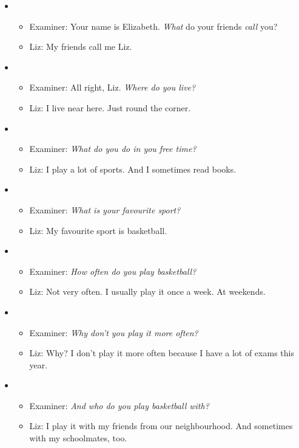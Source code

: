 \begin{itemize}

\item
\begin{itemize}
\item Examiner: Your name is Elizabeth. \textit{What} do your friends \textit{call} you?
\item Liz: My friends call me Liz.
\end{itemize}

\item
\begin{itemize}
\item Examiner: All right, Liz. \textit{Where do you live?}
\item Liz: I live near here. Just round the corner.
\end{itemize}

\item
\begin{itemize}
\item Examiner: \textit{What do you do in you free time?}
\item Liz: I play a lot of sports. And I sometimes read books.
\end{itemize}

\item
\begin{itemize}
\item Examiner: \textit{What is your favourite sport?}
\item Liz: My favourite sport is basketball.  
\end{itemize}

\item
\begin{itemize} 
\item Examiner: \textit{How often do you play basketball?}
\item Liz: Not very often. I usually play it once a week. At weekends.
\end{itemize}

\item
\begin{itemize} 
\item Examiner: \textit{Why don't you play it more often?}
\item Liz: Why? I don't play it more often because I have a lot of exams this year.
\end{itemize}

\item
\begin{itemize}
\item Examiner: \textit{And who do you play basketball with?}
\item Liz: I play it with my friends from our neighbourhood. And sometimes with my schoolmates, too.
\end{itemize}


\end{itemize}
